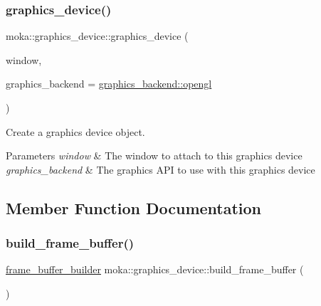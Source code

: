 \subsubsection{\texorpdfstring{graphics\_device()}{graphics\_device()}}
{\footnotesize\ttfamily moka\+::graphics\+\_\+device\+::graphics\+\_\+device (\begin{DoxyParamCaption}\item[{\mbox{\hyperlink{classmoka_1_1window}{window}} \&}]{window,  }\item[{\mbox{\hyperlink{namespacemoka_a6d27be7986842909ecfb039004d3f9e9}{graphics\+\_\+backend}}}]{graphics\+\_\+backend = {\ttfamily \mbox{\hyperlink{namespacemoka_a6d27be7986842909ecfb039004d3f9e9a6785e6b975db5d7cf223101ef1bc2f6f}{graphics\+\_\+backend\+::opengl}}} }\end{DoxyParamCaption})\hspace{0.3cm}{\ttfamily [explicit]}}



Create a graphics device object. 


\begin{DoxyParams}{Parameters}
{\em window} & The window to attach to this graphics device \\
\hline
{\em graphics\+\_\+backend} & The graphics A\+PI to use with this graphics device \\
\hline
\end{DoxyParams}


\subsection{Member Function Documentation}
\mbox{\label{classmoka_1_1graphics__device_a520088ba232098b0b2e6053d1a092542}} 
\subsubsection{\texorpdfstring{build\_frame\_buffer()}{build\_frame\_buffer()}}
{\footnotesize\ttfamily \mbox{\hyperlink{structmoka_1_1frame__buffer__builder}{frame\+\_\+buffer\+\_\+builder}} moka\+::graphics\+\_\+device\+::build\+\_\+frame\+\_\+buffer (\begin{DoxyParamCaption}{ }\end{DoxyParamCaption})}



